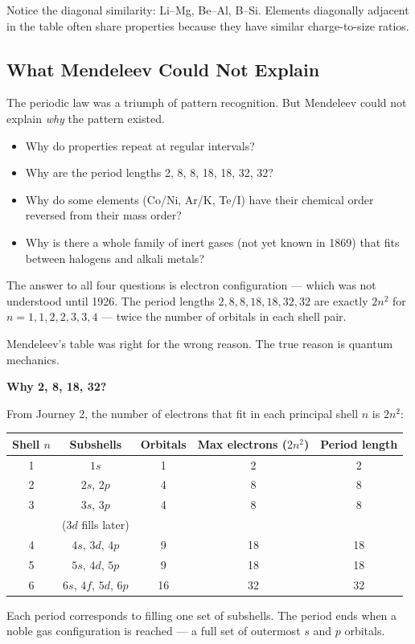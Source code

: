 \documentclass[12pt, a4paper]{book}
\begin{document}
\vspace{0.5em}

Notice the diagonal similarity:
Li--Mg, Be--Al, B--Si.
Elements diagonally adjacent in the table often share
properties because they have similar charge-to-size ratios.

\subsection{What Mendeleev Could Not Explain}

The periodic law was a triumph of pattern recognition.
But Mendeleev could not explain \emph{why} the pattern existed.

\begin{itemize}[nosep, leftmargin=2em]
  \item Why do properties repeat at regular intervals?
  \item Why are the period lengths 2, 8, 8, 18, 18, 32, 32?
  \item Why do some elements (Co/Ni, Ar/K, Te/I) have
        their chemical order reversed from their mass order?
  \item Why is there a whole family of inert gases
        (not yet known in 1869) that fits between halogens
        and alkali metals?
\end{itemize}

The answer to all four questions is electron configuration
--- which was not understood until 1926.
The period lengths $2, 8, 8, 18, 18, 32, 32$ are
exactly $2n^2$ for $n = 1, 1, 2, 2, 3, 3, 4$ ---
twice the number of orbitals in each shell pair.

Mendeleev's table was right for the wrong reason.
The true reason is quantum mechanics.

\begin{discoverybox}
\textbf{Why 2, 8, 18, 32?}

From Journey 2, the number of electrons that fit in each
principal shell $n$ is $2n^2$:

\begin{center}
\begin{tabular}{ccccc}
\toprule
Shell $n$ & Subshells & Orbitals & Max electrons ($2n^2$) & Period length \\
\midrule
1 & $1s$ & 1 & 2 & 2 \\
2 & $2s$, $2p$ & 4 & 8 & 8 \\
3 & $3s$, $3p$ & 4 & 8 & 8 \\
  & ($3d$ fills later) & & & \\
4 & $4s$, $3d$, $4p$ & 9 & 18 & 18 \\
5 & $5s$, $4d$, $5p$ & 9 & 18 & 18 \\
6 & $6s$, $4f$, $5d$, $6p$ & 16 & 32 & 32 \\
\bottomrule
\end{tabular}
\end{center}

Each period corresponds to filling one set of subshells.
The period ends when a noble gas configuration is reached ---
a full set of outermost $s$ and $p$ orbitals.
\end{discoverybox}
\end{document}

